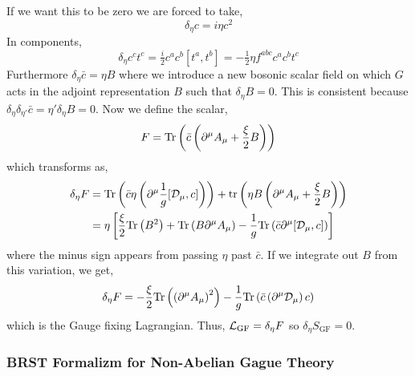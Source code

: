 \documentclass[12pt]{extarticle}
\begin{document}
If we want this to be zero we are forced to take,
\[ \delta_{\eta} c = i \eta c^2 \]
In components,
\[ \delta_{\eta} c^c t^c = \tfrac{i}{2} c^a c^b \left[ t^a, t^b \right] = - \tfrac{1}{2} \eta f^{abc} c^a c^b t^c \]
Furthermore $\delta_{\eta} \bar{c} = \eta B$ where we introduce a new bosonic scalar field on which $G$ acts in the adjoint representation $B$ such that $\delta_{\eta} B = 0$. This is consistent because $\delta_{\eta} \delta_{\eta'} \bar{c} = \eta' \delta_{\eta} B = 0$. Now we define the scalar,
\[ F = \mathrm{Tr}\left( \bar{c} \left( \partial^\mu A_\mu + \frac{\xi}{2} B \right) \right) \]
which transforms as,
\begin{align*}
\delta_{\eta} F & = \mathrm{Tr}\left( \bar{c} \eta \left( \partial^\mu \frac{1}{g} [ \mathcal{D}_\mu, c] \right)  \right) + \mathrm{tr} \left( \eta B \left( \partial^\mu A_\mu + \frac{\xi}{2} B \right) \right)
\\
& = \eta \left[ \frac{\xi}{2} \mathrm{Tr}\left( B^2 \right) + \mathrm{Tr}\left( B \partial^\mu A_\mu \right) - \frac{1}{g} \mathrm{Tr}\left( \bar{c} \partial^\mu [\mathcal{D}_\mu, c] \right) \right]
\end{align*}
where the minus sign appears from passing $\eta$ past $\bar{c}$. 
If we integrate out $B$ from this variation, we get,
\[ \delta_{\eta} F = - \frac{\xi}{2} \mathrm{Tr}\left( \left( \partial^\mu A_\mu \right)^2 \right) - \frac{1}{g} \mathrm{Tr}\left( \bar{c} \left( \partial^\mu \mathcal{D}_\mu \right) c \right) \]
which is the Gauge fixing Lagrangian. Thus, $\mathcal{L}_{\mathrm{GF}} = \delta_{\eta} F$ so $\delta_{\eta} S_{\mathrm{GF}} = 0$. 

\subsubsection{BRST Formalizm for Non-Abelian Gague Theory}
\end{document}
